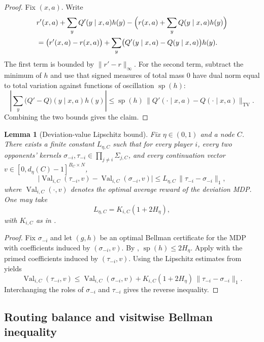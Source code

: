 \documentclass[12pt]{article}
\newtheorem{lemma}[theorem]{Lemma}
\theoremstyle{definition}
\newcommand{\1}{\mathbf{1}}
\DeclareMathOperator{\spn}{sp}
\begin{document}
\begin{proof}
Fix $(x,a)$. Write
\begin{align*}
&r'(x,a)+\sum_y Q'(y\mid x,a)h(y)
-
\Bigl(r(x,a)+\sum_y Q(y\mid x,a)h(y)\Bigr)
\\
&= \bigl(r'(x,a)-r(x,a)\bigr)
+
\sum_y\bigl(Q'(y\mid x,a)-Q(y\mid x,a)\bigr)h(y).
\end{align*}
The first term is bounded by $\|r'-r\|_\infty$. For the second term, subtract the
minimum of $h$ and use that signed measures of total mass $0$ have dual norm equal
to total variation against functions of oscillation $\spn(h)$:
\[
\left|\sum_y\bigl(Q'-Q\bigr)(y\mid x,a)h(y)\right|
\le
\spn(h)\,\|Q'(\cdot\mid x,a)-Q(\cdot\mid x,a)\|_{\mathrm{TV}}.
\]
Combining the two bounds gives the claim.
\end{proof}

\begin{lemma}[Deviation-value Lipschitz bound]
\label{lem:deviation-lipschitz}
Fix $\eta\in(0,1)$ and a node $C$. There exists a finite constant $L_{\eta,C}$
such that for every player $i$, every two opponents' kernels
$\sigma_{-i},\tau_{-i}\in\prod_{j\ne i}\Sigma_{j,C}$, and every continuation vector
$v\in[0,d_\eta(C)-1]^{B_C\times N}$,
\[
\bigl|\operatorname{Val}_{i,C}(\tau_{-i},v)-\operatorname{Val}_{i,C}(\sigma_{-i},v)\bigr|
\le L_{\eta,C}\,\|\tau_{-i}-\sigma_{-i}\|_1,
\]
where $\operatorname{Val}_{i,C}(\cdot,v)$ denotes the optimal average reward of the
deviation MDP. One may take
\[
L_{\eta,C}=K_{i,C}(1+2H_\eta),
\]
with $K_{i,C}$ as in .
\end{lemma}

\begin{proof}
Fix $\sigma_{-i}$ and let $(g,h)$ be an optimal Bellman certificate for the MDP with
coefficients induced by $(\sigma_{-i},v)$. By ,
$\spn(h)\le 2H_\eta$. Apply  with the primed
coefficients induced by $(\tau_{-i},v)$. Using the Lipschitz estimates from
 yields
\[
\operatorname{Val}_{i,C}(\tau_{-i},v)
\le
\operatorname{Val}_{i,C}(\sigma_{-i},v)
+
K_{i,C}(1+2H_\eta)\,\|\tau_{-i}-\sigma_{-i}\|_1.
\]
Interchanging the roles of $\sigma_{-i}$ and $\tau_{-i}$ gives the reverse
inequality.
\end{proof}



\subsection{Routing balance and visitwise Bellman inequality}
\end{document}
